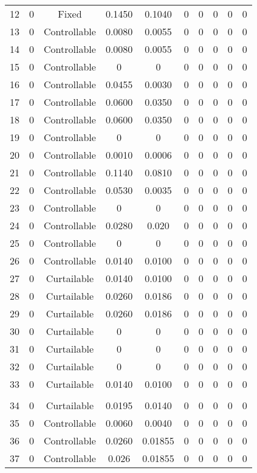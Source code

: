 \begin{longtable}{cccccccccc}
	12 & 0 & Fixed & 0.1450 & 0.1040 & 0 & 0 & 0 & 0 & 0 \\
	13 & 0 & Controllable & 0.0080 & 0.0055 & 0 & 0 & 0 & 0 & 0 \\
	14 & 0 & Controllable & 0.0080 & 0.0055 & 0 & 0 & 0 & 0 & 0 \\
	15 & 0 & Controllable & 0 & 0 & 0 & 0 & 0 & 0 & 0 \\
	16 & 0 & Controllable & 0.0455 & 0.0030 & 0 & 0 & 0 & 0 & 0 \\
	17 & 0 & Controllable & 0.0600 & 0.0350 & 0 & 0 & 0 & 0 & 0 \\
	18 & 0 & Controllable & 0.0600 & 0.0350 & 0 & 0 & 0 & 0 & 0 \\
	19 & 0 & Controllable & 0 & 0 & 0 & 0 & 0 & 0 & 0 \\
	20 & 0 & Controllable & 0.0010 & 0.0006 & 0 & 0 & 0 & 0 & 0 \\
	21 & 0 & Controllable & 0.1140 & 0.0810 & 0 & 0 & 0 & 0 & 0 \\
	22 & 0 & Controllable & 0.0530 & 0.0035 & 0 & 0 & 0 & 0 & 0 \\
	23 & 0 & Controllable & 0 & 0 & 0 & 0 & 0 & 0 & 0 \\
	24 & 0 & Controllable & 0.0280 & 0.020 & 0 & 0 & 0 & 0 & 0 \\
	25 & 0 & Controllable & 0 & 0 & 0 & 0 & 0 & 0 & 0 \\
	26 & 0 & Controllable & 0.0140 & 0.0100 & 0 & 0 & 0 & 0 & 0 \\
	27 & 0 & Curtailable & 0.0140 & 0.0100 & 0 & 0 & 0 & 0 & 0 \\
	28 & 0 & Curtailable & 0.0260 & 0.0186 & 0 & 0 & 0 & 0 & 0 \\
	29 & 0 & Curtailable & 0.0260 & 0.0186 & 0 & 0 & 0 & 0 & 0 \\
	30 & 0 & Curtailable & 0 & 0 & 0 & 0 & 0 & 0 & 0 \\
	31 & 0 & Curtailable & 0 & 0 & 0 & 0 & 0 & 0 & 0 \\
	32 & 0 & Curtailable & 0 & 0 & 0 & 0 & 0 & 0 & 0 \\
	33 & 0 & Curtailable & 0.0140 & 0.0100 & 0 & 0 & 0 & 0 & 0 \\
	\toprule  \\ 
	\toprule 
	34 & 0 & Curtailable & 0.0195 & 0.0140 & 0 & 0 & 0 & 0 & 0 \\
	35 & 0 & Controllable & 0.0060 & 0.0040 & 0 & 0 & 0 & 0 & 0 \\
	36 & 0 & Controllable & 0.0260 & 0.01855 & 0 & 0 & 0 & 0 & 0 \\
	37 & 0 & Controllable & 0.026 & 0.01855 & 0 & 0 & 0 & 0 & 0 \\

\end{longtable}
